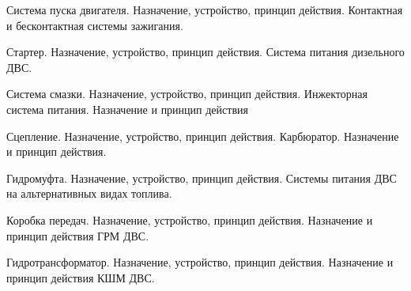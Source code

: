 \documentclass[
	14pt,
	a4paper,
	]
	{scrartcl}
\begin{document}
\shapk
{}
\setcounter{zad}{0}

\vfill
\z Система пуска двигателя. Назначение, устройство, принцип действия.
 \vfill
\z Контактная и бесконтактная системы зажигания. 
 \vfill

\vfill

\newpage


\shapk
{}
\setcounter{zad}{0}

\vfill
\z Стартер. Назначение, устройство, принцип действия.
 \vfill
\z Система питания дизельного ДВС.
 \vfill

\vfill

\newpage


\shapk
{}
\setcounter{zad}{0}

\vfill
\z Система смазки. Назначение, устройство, принцип действия.
 \vfill
\z Инжекторная система питания. Назначение и принцип действия
 \vfill

\vfill

\newpage


\shapk
{}
\setcounter{zad}{0}

\vfill
\z Сцепление. Назначение, устройство, принцип действия.
 \vfill
\z Карбюратор. Назначение и принцип действия.
 \vfill

\vfill

\newpage


\shapk
{}
\setcounter{zad}{0}

\vfill
\z Гидромуфта. Назначение, устройство, принцип действия.
 \vfill
\z Системы питания ДВС на альтернативных видах топлива.
 \vfill

\vfill

\newpage


\shapk
{}
\setcounter{zad}{0}

\vfill
\z Коробка передач. Назначение, устройство, принцип действия.
 \vfill
\z Назначение и принцип действия ГРМ ДВС.
 \vfill

\vfill

\newpage


\shapk
{}
\setcounter{zad}{0}

\vfill
\z Гидротрансформатор. Назначение, устройство, принцип действия.
 \vfill
\z Назначение и принцип действия КШМ ДВС.
 \vfill

\vfill

\newpage


\shapk
{}
\setcounter{zad}{0}
\end{document}
